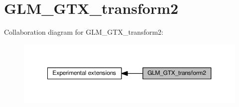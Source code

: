 \hypertarget{group__gtx__transform2}{}\section{G\+L\+M\+\_\+\+G\+T\+X\+\_\+transform2}
\label{group__gtx__transform2}
Collaboration diagram for G\+L\+M\+\_\+\+G\+T\+X\+\_\+transform2\+:
\nopagebreak
\begin{figure}[H]
\begin{center}
\leavevmode
\includegraphics[width=350pt]{df/dfe/group__gtx__transform2}
\end{center}
\end{figure}
